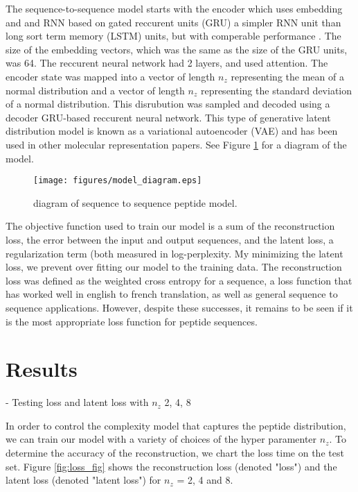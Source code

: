 \documentclass[preprint,12pt]{elsarticle}
\begin{document}
The sequence-to-sequence model starts with the encoder which uses embedding and and RNN based on gated reccurent units (GRU) a simpler RNN unit than long sort term memory (LSTM) units, but with comperable performance \cite{chung2014empirical}. The size of the embedding vectors, which was the same as the size of the GRU units, was 64. The reccurent neural network had 2 layers, and used attention\cite{chorowski2014end}. The encoder state was mapped into a vector of length $n_z$ representing the mean of a normal distribution and a vector of length $n_z$ representing the standard deviation of a normal distribution. This disrubution was sampled and decoded using a decoder GRU-based reccurent neural network. This type of generative latent distribution model is known as a variational autoencoder (VAE) and has been used in other molecular representation papers\cite{gomez2016automatic}. See Figure \ref{model_diagram} for a diagram of the model.

\begin{figure}
  \centering
  \texttt{[image: figures/model\_diagram.eps]}
  \caption{diagram of sequence to sequence peptide model.}
  \label{model_diagram}
\end{figure}

The objective function used to train our model is a sum of the reconstruction loss, the error between the input and output sequences, and the latent loss, a regularization term (both measured in log-perplexity. My minimizing the latent loss, we prevent over fitting our model to the training data. The reconstruction loss was defined as the weighted cross entropy for a sequence, a loss function that has worked well in english to french translation, as well as general sequence to sequence applications\cite{vinyals2015grammar}. However, despite these successes, it remains to be seen if it is the most appropriate loss function for peptide sequences.

\section{Results}

- Testing loss and latent loss with $n_z$ 2, 4, 8

In order to control the complexity model that captures the peptide distribution, we can train our model with a variety of choices of the hyper paramenter $n_z$. To determine the accuracy of the reconstruction, we chart the loss time on the test set. Figure \ref{fig:loss_fig} shows the reconstruction loss (denoted "loss") and the latent loss (denoted "latent loss") for $n_z$ = 2, 4 and 8.
\end{document}
